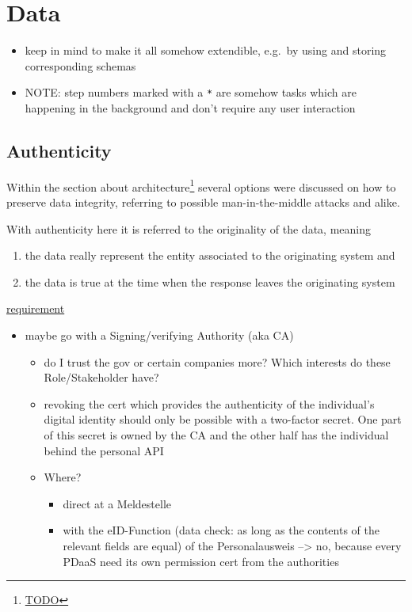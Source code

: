 \documentclass[12pt,english,a4paper,titlepage,cleardoublepage=empty,dottedtoc]{report}
\renewcommand{\href}[2]{#2\footnote{\url{#1}}}
\providecommand{\tightlist}{%
  \setlength{\itemsep}{0pt}\setlength{\parskip}{0pt}}
\begin{document}
\section{Data}\label{data}

\begin{itemize}
\item
  keep in mind to make it all somehow extendible, e.g.~by using and
  storing corresponding schemas
\item
  NOTE: step numbers marked with a \texttt{*} are somehow tasks which
  are happening in the background and don't require any user interaction
\end{itemize}

\subsection{Authenticity}\label{authenticity}

Within the section \href{TODO}{about architecture} several options were
discussed on how to preserve data integrity, referring to possible
man-in-the-middle attacks and alike.

With authenticity here it is referred to the originality of the data,
meaning

\begin{enumerate}
\def\labelenumi{(\Alph{enumi})}
\tightlist
\item
  the data really represent the entity associated to the originating
  system and
\item
  the data is true at the time when the response leaves the originating
  system
\end{enumerate}

\protect\hyperlink{sa04}{requirement}

\begin{itemize}
\tightlist
\item
  maybe go with a Signing/verifying Authority (aka CA)

  \begin{itemize}
  \tightlist
  \item
    do I trust the gov or certain companies more? Which interests do
    these Role/Stakeholder have?
  \item
    revoking the cert which provides the authenticity of the
    individual's digital identity should only be possible with a
    two-factor secret. One part of this secret is owned by the CA and
    the other half has the individual behind the personal API
  \item
    Where?

    \begin{itemize}
    \tightlist
    \item
      direct at a Meldestelle
    \item
      with the eID-Function (data check: as long as the contents of the
      relevant fields are equal) of the Personalausweis --\textgreater{}
      no, because every PDaaS need its own permission cert from the
      authorities
    \end{itemize}
  \end{itemize}
\end{itemize}
\end{document}
